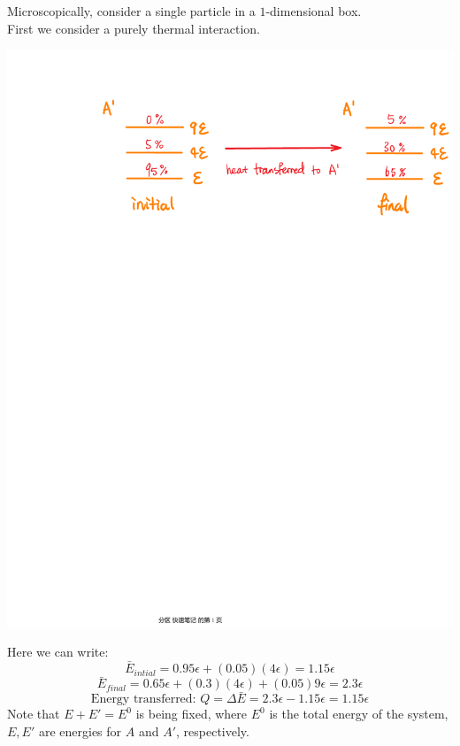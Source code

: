 \documentclass[11pt]{article}
\theoremstyle{break}
\theoremstyle{break}
\begin{document}
Microscopically, consider a single particle in a $1$-dimensional box.\\
First we consider a purely thermal interaction. 
\begin{center}
\includegraphics[scale=0.5]{thermalInteraction.pdf}
\end{center}
Here we can write:
$$\bar{E}_{intial} = 0.95 \epsilon + (0.05)(4\epsilon) = 1.15\epsilon$$
$$\bar{E}_{final} = 0.65 \epsilon + (0.3) (4\epsilon) + (0.05)9\epsilon = 2.3\epsilon$$
$$\text{Energy transferred: } Q = \Delta \bar{E} = 2.3\epsilon - 1.15\epsilon = 1.15\epsilon$$
Note that $E + E' = E^0$ is being fixed, where $E^0$ is the total energy of the system, $E,E'$ are energies for $A$ and $A'$, respectively. \\
\end{document}

